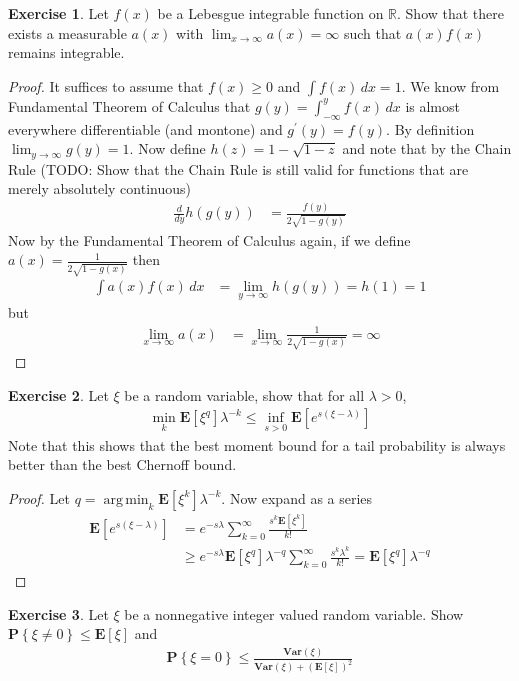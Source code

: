 \documentclass{amsbook}
\DeclareMathOperator*{\argmin}{arg\,min}
\theoremstyle{definition}
\newtheorem{xca}{Exercise}
\theoremstyle{remark}
\newcommand{\expectation}[1]{\textbf{E}\left[#1\right]}
\newcommand{\variance}[1]{\textbf{Var} \left (#1 \right )}
\newcommand{\probability}[1]{\textbf{P}\left \{#1 \right \}}
\newcommand{\reals}{\mathbb{R}}
\begin{document}
\begin{xca}Let $f(x)$ be a Lebesgue integrable function on $\reals$.
  Show that there exists a measurable $a(x)$ with $\lim_{x \to \infty}
  a(x) = \infty$ such that $a(x)f(x)$ remains integrable.
\end{xca}
\begin{proof}
It suffices to assume that $f(x) \geq 0$ and $\int f(x) \, dx = 1$.
We know from Fundamental Theorem of Calculus that $g(y) = \int_{-\infty}^y
f(x) \, dx$ is almost everywhere differentiable (and montone) and
$g^\prime(y) = f(y)$.   By
definition $\lim_{y \to \infty} g(y) = 1$.  Now define $h(z) = 1 -
\sqrt{1 -z}$ and note that by the Chain Rule (TODO: Show that the
Chain Rule is still valid for functions that are merely absolutely continuous)
\begin{align*}
\frac{d}{dy} h(g(y)) &= \frac{f(y)}{2 \sqrt{1 - g(y)}}
\end{align*}
Now by the Fundamental Theorem of Calculus again, if we define $a(x) =
\frac{1}{2 \sqrt{1 - g(x)}}$ 
then 
\begin{align*}
\int a(x) f(x) \, dx &= \lim_{y \to \infty} h(g(y)) = h(1) = 1
\end{align*}
but 
\begin{align*}
\lim_{x \to \infty} a(x) &= \lim_{x \to \infty} \frac{1}{2 \sqrt{1 -
    g(x)}} = \infty
\end{align*}
\end{proof}
\begin{xca}Let $\xi$ be a random variable, show that for all $\lambda > 0$,
\begin{align*}
\min_k \expectation{\xi^q} \lambda^{-k} \leq \inf_{s>0} \expectation{e^{s(\xi-\lambda)}}
\end{align*}
Note that this shows that the best moment bound for a tail
probability is always better than the best Chernoff bound.
\end{xca}
\begin{proof}
Let $q = \argmin_k \expectation{\xi^k} \lambda^{-k}$.  Now expand as a
series
\begin{align*}
\expectation{e^{s(\xi-\lambda)}} &= e^{-s\lambda} \sum_{k=0}^\infty
\frac{s^k \expectation{\xi^k}}{k!} \\
& \geq e^{-s\lambda} \expectation{\xi^q} \lambda^{-q} \sum_{k=0}^\infty
\frac{s^k \lambda^k}{k!} = \expectation{\xi^q} \lambda^{-q}
\end{align*}
\end{proof}
\begin{xca}Let $\xi$ be a nonnegative integer valued random variable.
  Show $\probability{\xi \neq 0} \leq \expectation{\xi}$ and 
\begin{align*}
\probability{\xi = 0} \leq \frac{\variance{\xi}}{\variance{\xi} + \left(\expectation{\xi}\right)^2}
\end{align*}
\end{xca}
\end{document}
